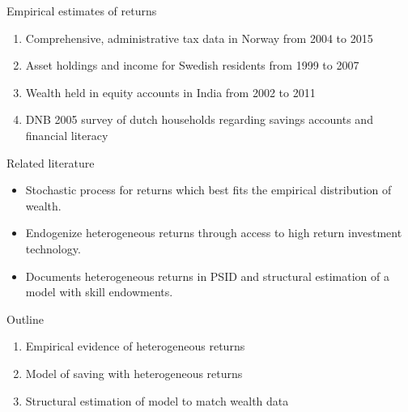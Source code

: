 \documentclass{beamer}
\begin{document}
\begin{frame}{Empirical estimates of returns}

   \small
   \begin{enumerate}
    \item Comprehensive, administrative tax data in Norway from 2004 to 2015  \parencite{aflgdmlp20}
    \item Asset holdings and income for Swedish residents from 1999 to 2007 \parencite{lblcps18}
    \item Wealth held in equity accounts in India from 2002 to 2011 \parencite{Campbell2019}
    \item DNB 2005 survey of dutch households regarding savings accounts and financial literacy \parencite{Deuflhard2018}
    \end{enumerate}
   
  
\end{frame}

\begin{frame}{Related literature}
\begin{itemize}

\item Stochastic process for returns which best fits the empirical distribution of wealth.
\par \parencite{Benhabib2019}

\item Endogenize heterogeneous returns through access to high return investment technology.
\par  \parencite{Guler2022}

\item Documents heterogeneous returns in PSID and structural estimation of a model with skill endowments.
\par \parencite{Daminato2024}
\end{itemize}
\end{frame}

\begin{frame}{Outline}
\begin{enumerate}
\item Empirical evidence of heterogeneous returns
\item Model of saving with heterogeneous returns
\item Structural estimation of model to match wealth data
\end{enumerate}
\end{frame}
\end{document}
